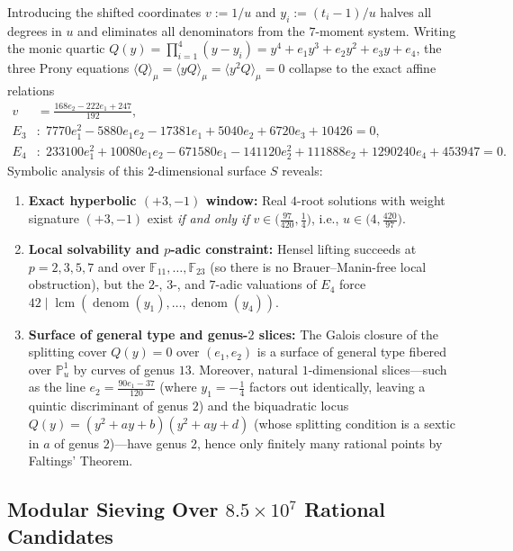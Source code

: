 \documentclass[11pt,a4paper]{article}
\theoremstyle{definition}
\theoremstyle{remark}
\newcommand{\PP}{\mathbb{P}}
\begin{document}
Introducing the shifted coordinates $v := 1/u$ and $y_i := (t_i - 1)/u$ halves all degrees in $u$ and eliminates all denominators from the $7$-moment system. Writing the monic quartic $Q(y) = \prod_{i=1}^4 (y - y_i) = y^4 + e_1 y^3 + e_2 y^2 + e_3 y + e_4$, the three Prony equations $\langle Q \rangle_\mu = \langle y Q \rangle_\mu = \langle y^2 Q \rangle_\mu = 0$ collapse to the exact affine relations
\begin{align*}
v &= \frac{168 e_2 - 222 e_1 + 247}{192}, \\
E_3 &:\; 7770 e_1^2 - 5880 e_1 e_2 - 17381 e_1 + 5040 e_2 + 6720 e_3 + 10426 = 0, \\
E_4 &:\; 233100 e_1^2 + 10080 e_1 e_2 - 671580 e_1 - 141120 e_2^2 + 111888 e_2 + 1290240 e_4 + 453947 = 0.
\end{align*}
Symbolic analysis of this $2$-dimensional surface $S$ reveals:
\begin{enumerate}
\item \textbf{Exact hyperbolic $(+3, -1)$ window:} Real $4$-root solutions with weight signature $(+3, -1)$ exist \emph{if and only if} $v \in \bigl(\frac{97}{420}, \frac{1}{4}\bigr)$, i.e., $u \in \bigl(4, \frac{420}{97}\bigr)$.
\item \textbf{Local solvability and $p$-adic constraint:} Hensel lifting succeeds at $p = 2, 3, 5, 7$ and over $\mathbb{F}_{11}, \dots, \mathbb{F}_{23}$ (so there is no Brauer--Manin-free local obstruction), but the $2$-, $3$-, and $7$-adic valuations of $E_4$ force $42 \mid \operatorname{lcm}(\operatorname{denom}(y_1), \dots, \operatorname{denom}(y_4))$.
\item \textbf{Surface of general type and genus-$2$ slices:} The Galois closure of the splitting cover $Q(y) = 0$ over $(e_1, e_2)$ is a surface of general type fibered over $\PP^1_u$ by curves of genus $13$. Moreover, natural $1$-dimensional slices---such as the line $e_2 = \frac{90 e_1 - 37}{120}$ (where $y_1 = -\frac{1}{4}$ factors out identically, leaving a quintic discriminant of genus $2$) and the biquadratic locus $Q(y) = (y^2 + a y + b)(y^2 + a y + d)$ (whose splitting condition is a sextic in $a$ of genus $2$)---have genus $2$, hence only finitely many rational points by Faltings' Theorem.
\end{enumerate}

\subsection{Modular Sieving Over $8.5 \times 10^7$ Rational Candidates}
\end{document}
